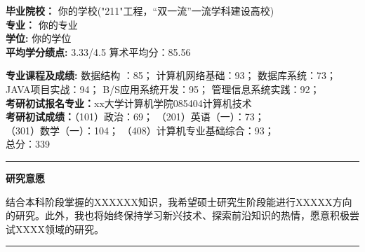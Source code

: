 \documentclass[10pt,A4]{article}
\newcommand{\cvsection}[1]
{
	\begin{flushleft}
		\large\textcolor{NJAUGREEN}{\textbf{#1}}
	\end{flushleft}
}
\newcommand{\metasection}[2]
{
\footnotesize{#2} \hspace*{\fill} \footnotesize{#1}\\[1pt]
}
\begin{document}
\metasection{}{\textbf{毕业院校：} 你的学校("211"工程，“双一流”一流学科建设高校)}
\metasection{}{\textbf{专业：} 你的专业} 
\metasection{}{\textbf{学位:} 你的学位}
\metasection{}{\textbf{平均学分绩点:} 3.33/4.5 \hspace*{53pt} 算术平均分：85.56}{}
\metasection{}{\textbf{专业课程及成绩:} 数据结构 ：85；  \hspace*{25pt}计算机网络基础：93； \hspace*{25pt}数据库系统：73；\\ \hspace*{58pt} JAVA项目实战：94； \hspace*{5pt}B/S应用系统开发：95； \hspace*{14pt}管理信息系统实践：92；}
\metasection{}{\textbf{考研初试报名专业：}xx大学\hspace*{2pt}计算机学院\hspace*{2pt}085404\hspace*{2pt}计算机技术}
\metasection{}{\textbf{考研初试成绩：}（101）政治：69； \hspace*{52pt}（201）英语（一）：73；\\ \hspace*{52pt}（301）数学（一）：104； \hspace*{27.5pt}（408）计算机专业基础综合：93；\\ \hspace*{58pt}总分：339}

\vspace{-15pt}

\textcolor{softcol}{\hrule}

\cvsection{研究意愿}
\vspace{-5pt}
{结合本科阶段掌握的XXXXXX知识，我希望硕士研究生阶段能进行XXXXX方向的研究。此外，我也将始终保持学习新兴技术、探索前沿知识的热情，愿意积极尝试XXXX领域的研究。}



\vspace{-5pt}
\textcolor{softcol}{\hrule}
%
%
\end{document}
